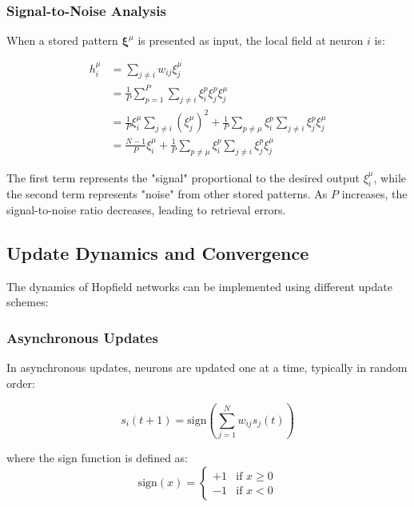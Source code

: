 \documentclass[11pt,a4paper]{article}
\begin{document}
\subsubsection{Signal-to-Noise Analysis}

When a stored pattern $\boldsymbol{\xi}^{\mu}$ is presented as input, the local field at neuron $i$ is:

\begin{align}
h_i^{\mu} &= \sum_{j \neq i} w_{ij} \xi_j^{\mu} \\
&= \frac{1}{P} \sum_{p=1}^{P} \sum_{j \neq i} \xi_i^p \xi_j^p \xi_j^{\mu} \\
&= \frac{1}{P} \xi_i^{\mu} \sum_{j \neq i} (\xi_j^{\mu})^2 + \frac{1}{P} \sum_{p \neq \mu} \xi_i^p \sum_{j \neq i} \xi_j^p \xi_j^{\mu} \\
&= \frac{N-1}{P} \xi_i^{\mu} + \frac{1}{P} \sum_{p \neq \mu} \xi_i^p \sum_{j \neq i} \xi_j^p \xi_j^{\mu}
\end{align}

The first term represents the "signal" proportional to the desired output $\xi_i^{\mu}$, while the second term represents "noise" from other stored patterns. As $P$ increases, the signal-to-noise ratio decreases, leading to retrieval errors.

\subsection{Update Dynamics and Convergence}

The dynamics of Hopfield networks can be implemented using different update schemes:

\subsubsection{Asynchronous Updates}

In asynchronous updates, neurons are updated one at a time, typically in random order:

\begin{equation}
s_i(t+1) = \text{sign}\left(\sum_{j=1}^{N} w_{ij} s_j(t)\right)
\label{eq:async_update}
\end{equation}

where the sign function is defined as:
\begin{equation}
\text{sign}(x) = \begin{cases}
+1 & \text{if } x \geq 0 \\
-1 & \text{if } x < 0
\end{cases}
\end{equation}
\end{document}
